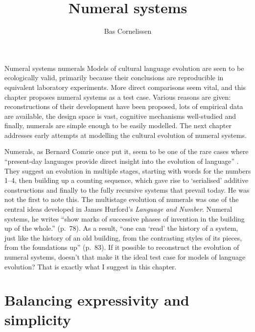 \documentclass{../src/bcthesispart}
\title{Numeral systems}
\author{Bas Cornelissen}
\begin{document}
%
	{Numeral systems}%
	{numerals}%
	{%
	Models of cultural language evolution are seen to be ecologically valid, primarily because their conclusions are reproducible in equivalent laboratory experiments.
	More direct comparisons seem vital, and this chapter proposes numeral systems as a test case.
	Various reasons are given: reconstructions of their development have been proposed, lots of empirical data are available, the design space is vast, cognitive mechanisms well-studied and finally, numerals are simple enough to be easily modelled.
	The next chapter addresses early attempts at modelling the cultural evolution of numeral systems.
	}



\noindent
Numerals, as Bernard Comrie once put it, seem to be one of the rare cases where “present-day languages provide direct insight into the evolution of language” \parencite{Comrie2013}.
They suggest an evolution in multiple stages, starting with words for the  numbers 1--4, then building up a counting sequence, which gave rise to ‘serialised’ additive constructions and finally to the fully recursive systems that prevail today.
He was not the first to note this.
The multistage evolution of numerals was one of the central ideas developed in James Hurford’s \emph{Language and Number}.
Numeral systems, he writes “show marks of successive phases of invention in the building up of the whole.” (p.~78).
As a result, “one can ‘read’ the history of a system, just like the history of an old building, from the contrasting styles of its pieces, from the foundations up” (p.\ 83).
If it possible to reconstruct the evolution of numeral systems, doesn’t that make it the ideal test case for models of language evolution?
That is exactly what I suggest in this chapter.



\section{Balancing expressivity and simplicity}
\end{document}
